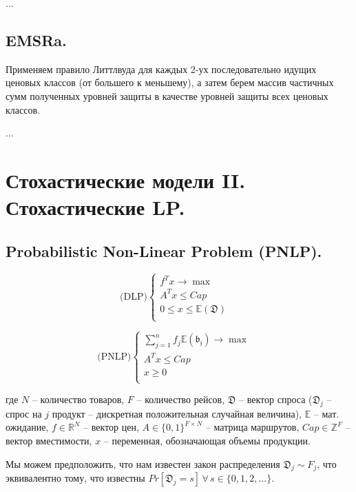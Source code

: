 \documentclass[12pt, reqno]{article}
\theoremstyle{definition}
\theoremstyle{definition}
\theoremstyle{definition}
\theoremstyle{definition}
\theoremstyle{definition}
\theoremstyle{definition}
\theoremstyle{definition}
\theoremstyle{definition}
\theoremstyle{definition}
\begin{document}
		...
		
		
		\subsection{EMSRa.}
		Применяем правило Литтлвуда для каждых 2-ух последовательно идущих ценовых классов (от большего к меньшему), а затем берем массив частичных сумм полученных уровней защиты в качестве уровней защиты всех ценовых классов.
		
		...
		
	
	\newpage
	\section{Стохастические модели II. Стохастические LP.}
			
		\subsection{Probabilistic Non-Linear Problem (PNLP).}
		
		\begin{multicols}{2}
			$$
			\text{(DLP)}
			\begin{cases}
				f^Tx \rightarrow \max & \\
				A^Tx \leq Cap & \\
				0 \leq x \leq \mathds{E}(\mathfrak{D}) & \\
			\end{cases}	
			$$
			
			\columnbreak
			
			$$
			\text{(PNLP)}
			\begin{cases}
				\sum\limits_{j=1}^n f_j \mathds{E}(\mathfrak{b_j}) \rightarrow \max & \\
				A^Tx \leq Cap & \\
				x \geq 0 & \\
			\end{cases}
			$$
		\end{multicols}
		
		где $N$ -- количество товаров, $F$ -- количество рейсов, $\mathfrak{D}$ -- вектор спроса ($\mathfrak{D}_j$ -- спрос на $j$ продукт -- дискретная положительная случайная величина), $\mathds{E}$ -- мат. ожидание, $f \in \mathds{R}^N$ -- вектор цен, $A \in \{0, 1\}^{F \times N}$ -- матрица маршрутов, $Cap \in \mathds{Z}^F$ -- вектор вместимости, $x$ -- переменная, обозначающая объемы продукции.
		
		Мы можем предположить, что нам известен закон распределения $\mathfrak{D}_j \sim F_j$, что эквивалентно тому, что известны $Pr[\mathfrak{D}_j = s]\,\forall\,s \in \{0, 1, 2, ...\}$.
		
\end{document}
